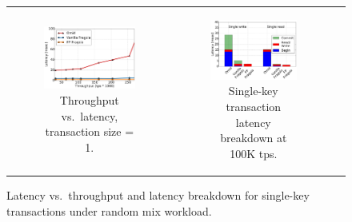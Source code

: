 \begin{figure}[t!]
\centering
\begin{tabular}{ccc}
      \begin{subfigure}[t]{0.45\textwidth}
      	\includegraphics[width=\textwidth]{figs/throughputlatency1.pdf}
	    \caption{Throughput vs.\ latency, transaction size = 1.}
        \label{fig:tl-1}      
      \end{subfigure} & 

      \begin{subfigure}[t]{0.45\textwidth}
      	\includegraphics[width=\textwidth]{figs/latency_PUTGET.pdf}
        \caption[]{Single-key transaction latency breakdown at 100K tps.}
        \label{fig:stack-brc}
      \end{subfigure}  & 

\end{tabular}
       \caption{Latency vs.\ throughput and latency breakdown  for single-key transactions under  random mix workload. }
\end{figure}


